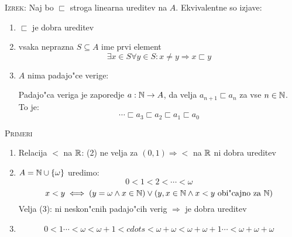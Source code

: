 \textsc{Izrek:} Naj bo $\sqsubset$ stroga linearna ureditev na $A$. Ekvivalentne so izjave:
\begin{enumerate}
	\item $\sqsubset$ je dobra ureditev\item vsaka neprazna $S \subseteq A$ ime prvi element
	\begin{equation*}
	\exists x \in S \forall y \in S: x \neq y \Rightarrow x \sqsubset y
	\end{equation*}
	\item $A$ nima padajo"ce verige:
	
	Padajo"ca veriga je zaporedje $a: \mathbb{N} \to A$, da velja $a_{n+1} \sqsubset a_n$ za vse $n \in \mathbb{N}$. To je:
	\begin{equation*}
	\cdots \sqsubset a_3 \sqsubset a_2 \sqsubset a_1 \sqsubset a_0
	\end{equation*}
\end{enumerate}
\textsc{Primeri}
\begin{enumerate}
	\item Relacija $<$ na $\mathbb{R}$: (2) ne velja za $(0, 1) \Rightarrow <$ na $\mathbb{R}$ ni dobra ureditev
	
	\item $A = \mathbb{N} \cup \{\omega\}$ uredimo:
	\begin{equation*}
	0 < 1 < 2 < \cdots < \omega
	\end{equation*}
	\begin{equation*}
	x < y \iff (y = \omega \land x \in \mathbb{N}) \lor (y, x \in \mathbb{N} \land x < y \text{ obi"cajno za $\mathbb{N}$})
	\end{equation*}
	Velja (3): ni neskon"cnih padajo"cih verig $\Rightarrow$ je dobra ureditev
	
	\item 
	\begin{equation*}
	0 < 1 \cdots < \omega < \omega + 1 < cdots < \omega + \omega < \omega + \omega + 1 \cdots < \omega + \omega + \omega
	\end{equation*}
\end{enumerate}